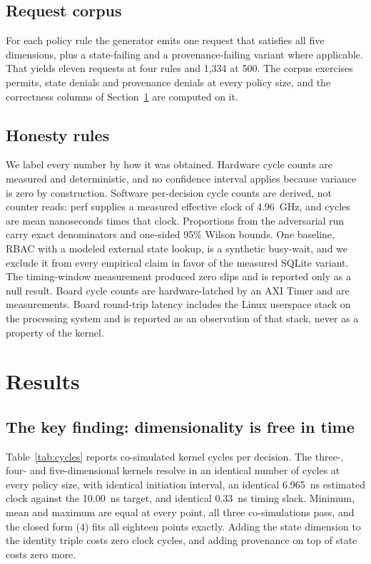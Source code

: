 \documentclass[conference]{IEEEtran}
\newcommand{\new}[1]{\textcolor{hkred}{#1}}
\begin{document}
\subsection{Request corpus}

For each policy rule the generator emits one request that satisfies all five dimensions, plus a state-failing and a provenance-failing variant where applicable. That yields eleven requests at four rules and 1{,}334 at 500. The corpus exercises permits, state denials and provenance denials at every policy size, and the correctness columns of Section~\ref{sec:results} are computed on it.

\subsection{Honesty rules}

We label every number by how it was obtained. Hardware cycle counts are measured and deterministic, and no confidence interval applies because variance is zero by construction. Software per-decision cycle counts are derived, not counter reads: perf supplies a measured effective clock of 4.96~GHz, and cycles are mean nanoseconds times that clock. Proportions from the adversarial run carry exact denominators and one-sided 95\% Wilson bounds. One baseline, RBAC with a modeled external state lookup, is a synthetic busy-wait, and we exclude it from every empirical claim in favor of the measured SQLite variant. The timing-window measurement produced zero slips and is reported only as a null result. \new{Board cycle counts are hardware-latched by an AXI Timer and are measurements. Board round-trip latency includes the Linux userspace stack on the processing system and is reported as an observation of that stack, never as a property of the kernel.}

\section{Results}
\label{sec:results}

\subsection{The key finding: dimensionality is free in time}

Table~\ref{tab:cycles} reports co-simulated kernel cycles per decision. The \new{three-, }four- and five-dimensional kernels resolve in an identical number of cycles at every policy size, with identical initiation interval, \new{an identical 6.965~ns estimated clock against the 10.00~ns target, }and identical 0.33~ns timing slack. Minimum, mean and maximum are equal at every point\new{, all three co-simulations pass,} and the closed form (4) fits all \new{eighteen} points exactly. \new{Adding the state dimension to the identity triple costs zero clock cycles, and adding provenance on top of state costs zero more.}
\end{document}
